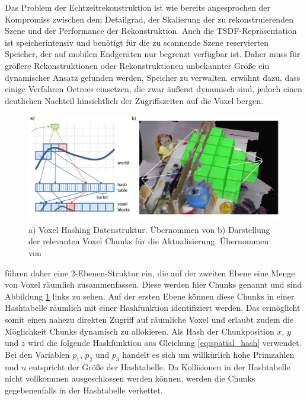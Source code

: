 Das Problem der Echtzeitrekonstruktion ist wie bereits angesprochen der Kompromiss zwischen dem Detailgrad, der Skalierung der zu rekonstruierenden Szene und der Performance der Rekonstruktion. Auch die TSDF-Repräsentation ist speicherintensiv und benötigt für die zu scannende Szene reservierten Speicher, der auf mobilen Endgeräten nur begrenzt verfügbar ist. Daher muss für größere Rekonstruktionen oder Rekonstruktionen unbekannter Größe ein dynamischer Ansatz gefunden werden, Speicher zu verwalten. \citet{Klingensmith_2015_7924} erwähnt dazu, dass einige Verfahren Octrees einsetzen, die zwar äußerst dynamisch sind, jedoch einen deutlichen Nachteil hinsichtlich der Zugriffszeiten auf die Voxel bergen. 

\begin{figure}[h]
  \centering
	\includegraphics[width=1.0\textwidth]{content/images/methods/hashing.png} 
  \caption{a) Voxel Hashing Datenstruktur. Übernommen von \citet{niessner2013real} b) Darstellung der relevanten Voxel Chunks für die Aktualisierung. Übernommen von \citet{Klingensmith_2015_7924}}
  \label{fig:hashing}
\end{figure}

\citet{niessner2013real} führen daher eine 2-Ebenen-Struktur ein, die auf der zweiten Ebene eine Menge von Voxel räumlich zusammenfassen. Diese werden hier Chunks genannt und sind Abbildung \ref{fig:hashing} links zu sehen. Auf der ersten Ebene können diese Chunks in einer Hashtabelle räumlich mit einer Hashfunktion identifiziert werden. Das ermöglicht somit einen nahezu direkten Zugriff auf räumliche Voxel und erlaubt zudem die Möglichkeit Chunks dynamisch zu allokieren. Als Hash der Chunkposition \(x\), \(y\) und \(z\) wird die folgende Hashfunktion aus Gleichung \ref{eq:spatial_hash} verwendet. Bei den Variablen \(p_1\), \(p_2\) und \(p_3\) handelt es sich um willkürlich hohe Primzahlen und \(n\) entspricht der Größe der Hashtabelle. Da Kollisionen in der Hashtabelle nicht vollkommen ausgeschlossen werden können, werden die Chunks gegebenenfalls in der Hashtabelle verkettet.

